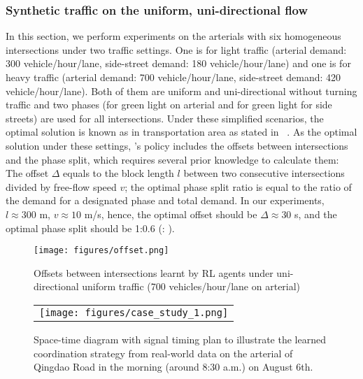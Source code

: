 \subsubsection{Synthetic traffic on the uniform, uni-directional flow}

In this section, we perform experiments on the arterials with six homogeneous intersections under two traffic settings. One is for light traffic (arterial demand: 300 vehicle/hour/lane, side-street demand: 180 vehicle/hour/lane) and one is for heavy traffic (arterial demand: 700 vehicle/hour/lane, side-street demand: 420 vehicle/hour/lane). Both of them are uniform and uni-directional without turning traffic and two phases (\WE for green light on arterial and \SN for green light for side streets) are used for all intersections. Under these simplified scenarios, the optimal solution is known as \Greenwave in transportation area as stated in ~\cite{Roess2011t}. As the optimal solution under these settings, \Greenwave's policy includes the offsets between intersections and the phase split, which requires several prior knowledge to calculate them: The offset $\Delta$ equals to the block length $l$ between two consecutive intersections divided by free-flow speed $v$; the optimal phase split ratio is equal to the ratio of the demand for a designated phase and total demand. In our experiments, $l\approx 300$ m, $v\approx 10$ m/s, hence, the optimal offset should be $\Delta\approx 30$ s, and the optimal phase split should be 1:0.6 (\WE : \SN).

\begin{figure}[t!]
  \centering
	\texttt{[image: figures/offset.png]}
     \caption{Offsets between intersections learnt by RL agents under uni-directional uniform traffic (700 vehicles/hour/lane on arterial) }   
    \label{fig:case-study}
\end{figure}

\begin{figure}[t!]
  \centering
  \begin{tabular}{c}
   \texttt{[image: figures/case\_study\_1.png]} \\
   \end{tabular}
     \caption{Space-time diagram with signal timing plan to illustrate the learned coordination strategy from real-world data on the arterial of Qingdao Road in the morning (around 8:30 a.m.) on August 6th.}
    \label{fig:case-study-real}
\end{figure}

